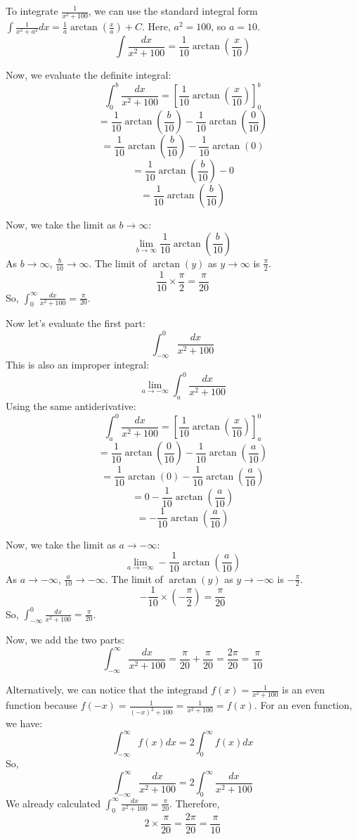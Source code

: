 \documentclass{article}
\begin{document}
To integrate $\frac{1}{x^2 + 100}$, we can use the standard integral form $\int \frac{1}{x^2 + a^2} dx = \frac{1}{a} \arctan\left(\frac{x}{a}\right) + C$.
Here, $a^2 = 100$, so $a = 10$.
$$ \int \frac{dx}{x^2 + 100} = \frac{1}{10} \arctan\left(\frac{x}{10}\right) $$

Now, we evaluate the definite integral:
$$ \int_{0}^{b} \frac{dx}{x^2 + 100} = \left[ \frac{1}{10} \arctan\left(\frac{x}{10}\right) \right]_{0}^{b} $$
$$ = \frac{1}{10} \arctan\left(\frac{b}{10}\right) - \frac{1}{10} \arctan\left(\frac{0}{10}\right) $$
$$ = \frac{1}{10} \arctan\left(\frac{b}{10}\right) - \frac{1}{10} \arctan(0) $$
$$ = \frac{1}{10} \arctan\left(\frac{b}{10}\right) - 0 $$
$$ = \frac{1}{10} \arctan\left(\frac{b}{10}\right) $$

Now, we take the limit as $b \to \infty$:
$$ \lim_{b \to \infty} \frac{1}{10} \arctan\left(\frac{b}{10}\right) $$
As $b \to \infty$, $\frac{b}{10} \to \infty$. The limit of $\arctan(y)$ as $y \to \infty$ is $\frac{\pi}{2}$.
$$ \frac{1}{10} \times \frac{\pi}{2} = \frac{\pi}{20} $$
So, $\int_{0}^{\infty} \frac{dx}{x^2 + 100} = \frac{\pi}{20}$.

Now let's evaluate the first part:
$$ \int_{-\infty}^{0} \frac{dx}{x^2 + 100} $$
This is also an improper integral:
$$ \lim_{a \to -\infty} \int_{a}^{0} \frac{dx}{x^2 + 100} $$
Using the same antiderivative:
$$ \int_{a}^{0} \frac{dx}{x^2 + 100} = \left[ \frac{1}{10} \arctan\left(\frac{x}{10}\right) \right]_{a}^{0} $$
$$ = \frac{1}{10} \arctan\left(\frac{0}{10}\right) - \frac{1}{10} \arctan\left(\frac{a}{10}\right) $$
$$ = \frac{1}{10} \arctan(0) - \frac{1}{10} \arctan\left(\frac{a}{10}\right) $$
$$ = 0 - \frac{1}{10} \arctan\left(\frac{a}{10}\right) $$
$$ = -\frac{1}{10} \arctan\left(\frac{a}{10}\right) $$

Now, we take the limit as $a \to -\infty$:
$$ \lim_{a \to -\infty} -\frac{1}{10} \arctan\left(\frac{a}{10}\right) $$
As $a \to -\infty$, $\frac{a}{10} \to -\infty$. The limit of $\arctan(y)$ as $y \to -\infty$ is $-\frac{\pi}{2}$.
$$ -\frac{1}{10} \times \left(-\frac{\pi}{2}\right) = \frac{\pi}{20} $$
So, $\int_{-\infty}^{0} \frac{dx}{x^2 + 100} = \frac{\pi}{20}$.

Now, we add the two parts:
$$ \int_{-\infty}^{\infty} \frac{dx}{x^2 + 100} = \frac{\pi}{20} + \frac{\pi}{20} = \frac{2\pi}{20} = \frac{\pi}{10} $$

Alternatively, we can notice that the integrand $f(x) = \frac{1}{x^2 + 100}$ is an even function because $f(-x) = \frac{1}{(-x)^2 + 100} = \frac{1}{x^2 + 100} = f(x)$.
For an even function, we have:
$$ \int_{-\infty}^{\infty} f(x) dx = 2 \int_{0}^{\infty} f(x) dx $$
So,
$$ \int_{-\infty}^{\infty} \frac{dx}{x^2 + 100} = 2 \int_{0}^{\infty} \frac{dx}{x^2 + 100} $$
We already calculated $\int_{0}^{\infty} \frac{dx}{x^2 + 100} = \frac{\pi}{20}$.
Therefore,
$$ 2 \times \frac{\pi}{20} = \frac{2\pi}{20} = \frac{\pi}{10} $$
\end{document}
